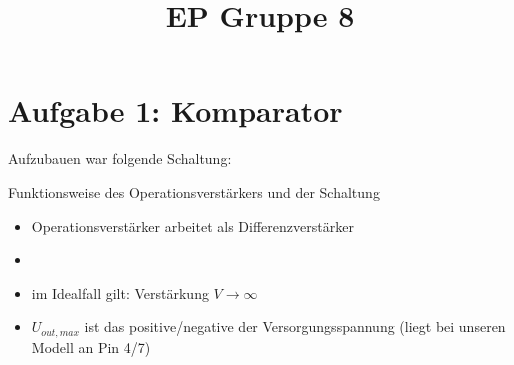 \documentclass[compress,11pt]{beamer}
\title{EP Gruppe 8}
\begin{document}
\section{Aufgabe 1: Komparator}
\begin{frame}
Aufzubauen war folgende Schaltung:
\end{frame}

\begin{frame}
\begin{block}{Funktionsweise des Operationsverstärkers und der Schaltung}
\begin{itemize}
\item Operationsverstärker arbeitet als Differenzverstärker
\item 
\item im Idealfall gilt: Verstärkung $V \rightarrow \infty$
\item $U_{out,max}$ ist das positive/negative der Versorgungsspannung (liegt bei unseren Modell an Pin 4/7)
\end{itemize}

\end{block}
\end{frame}
\end{document}
